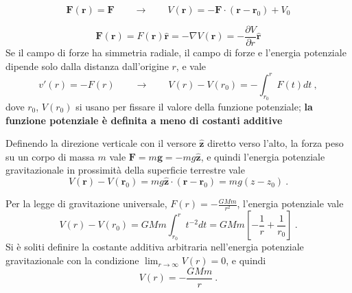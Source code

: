 \begin{example}
    \begin{equation}
        \mathbf{F}(\mathbf{r}) = \mathbf{F} \qquad \rightarrow \qquad V(\mathbf{r}) = - \mathbf{F} \cdot ( \mathbf{r} - \mathbf{r}_0 ) + V_0
    \end{equation}
\end{example}
\begin{example}
    \begin{equation}
        \mathbf{F}(\mathbf{r}) = F(\mathbf{r}) \mathbf{\hat{r}} = - \nabla V(\mathbf{r}) = - \dfrac{\partial V}{\partial r} \mathbf{\hat{r}}
    \end{equation}
    Se il campo di forze ha simmetria radiale, il campo di forze e l'energia potenziale dipende solo dalla distanza dall'origine $r$, e vale
    \begin{equation}
        v'(r) = - F(r) \qquad \rightarrow \qquad V(r) - V(r_0) = - \int_{r_0}^{r} F(t) dt \ ,
    \end{equation}
    dove {\color{red} $r_0$, $V(r_0)$ si usano per fissare il valore della funzione potenziale; \textbf{la funzione potenziale è definita a meno di costanti additive}}
\end{example}
\begin{example} Definendo la direzione verticale con il versore $\mathbf{\hat{z}}$ diretto verso l'alto, la forza peso su un corpo di massa $m$ vale $\mathbf{F} = m \mathbf{g} = - m g \mathbf{\hat{z}}$, e quindi l'energia potenziale gravitazionale in prossimità della superficie terrestre vale
    \begin{equation}
        V(\mathbf{r}) - V(\mathbf{r}_0) = m g \mathbf{\hat{z}} \cdot ( \mathbf{r} - \mathbf{r}_0 ) = m g ( z - z_0 ) \ .
    \end{equation}
\end{example}
\begin{example} Per la legge di gravitazione universale, $F(r) = -\frac{G M m}{r^2}$, l'energia potenziale vale
    \begin{equation}
        V(r) - V(r_0) = G M m \int_{r_0}^{r} t^{-2} dt = G M m \left[ -\dfrac{1}{r} + \dfrac{1}{r_0} \right] \ .
    \end{equation}
Si è soliti definire la costante additiva arbitraria nell'energia potenziale gravitazionale con la condizione $\lim_{r \rightarrow \infty} V(r) = 0$, e quindi
    \begin{equation}
        V(r) = - \dfrac{G M m}{r} \ .
    \end{equation}
\end{example}
